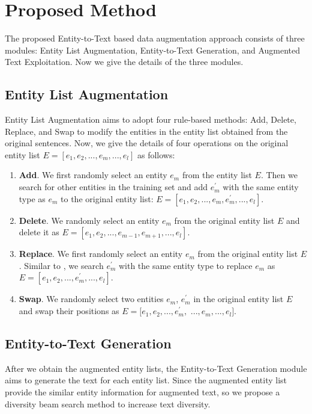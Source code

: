 \section{Proposed Method}
The proposed Entity-to-Text based data augmentation approach {\modelname} consists of three modules: Entity List Augmentation, Entity-to-Text Generation, and Augmented Text Exploitation. Now we give the details of the three modules.
\label{sec:baseline}

\subsection{Entity List Augmentation}
Entity List Augmentation aims to adopt four rule-based methods: Add, Delete, Replace, and Swap to modify the entities in the entity list obtained from the original sentences. Now, we give the details of four operations on the original entity list ${E = [{e}_{1}, {e}_{2}, ..., {e}_{m}, ..., {e}_{l}]}$ as follows:
\begin{enumerate}[label=\protect\circled{\arabic*}]
    \item \textbf{Add}. We first randomly select an entity ${{e}_{m}}$ from the entity list ${E}$. Then we search for other entities in the training set and add ${{e}_{m}^{'}}$ with the same entity type as ${{e}_{m}}$ to the original entity list: ${E = [{e}_{1}, {e}_{2}, ..., {e}_{m}, {e}_{m}^{'}, ..., {e}_{l}]}$.
    \item \textbf{Delete}. We randomly select an entity ${{e}_{m}}$ from the original entity list ${E}$ and delete it as ${E = [{e}_{1}, {e}_{2}, ..., {e}_{m-1}, {e}_{m+1},..., {e}_{l}]}$.
    \item \textbf{Replace}. We first randomly select an entity ${{e}_{m}}$ from the original entity list ${E}$. Similar to  , we search ${{e}_{m}^{'}}$ with the same entity type to replace ${{e}_{m}}$ as ${E = [{e}_{1}, {e}_{2}, ..., {e}_{m}^{'}, ..., {e}_{l}]}$.
    \item \textbf{Swap}. We randomly select two entities ${{e}_{m}}$, ${{e}_{m}^{'}}$ in the original entity list ${E}$ and swap their positions as ${E = [{e}_{1}, {e}_{2}, ..., {e}_{m}^{'},}$
    ${ ...,{e}_{m},..., {e}_{l}]}$.
\end{enumerate}

\subsection{Entity-to-Text Generation}
After we obtain the augmented entity lists, the Entity-to-Text Generation module aims to generate the text for each entity list. Since the augmented entity list provide the similar entity information for augmented text, so we propose a diversity beam search method to increase text diversity.

